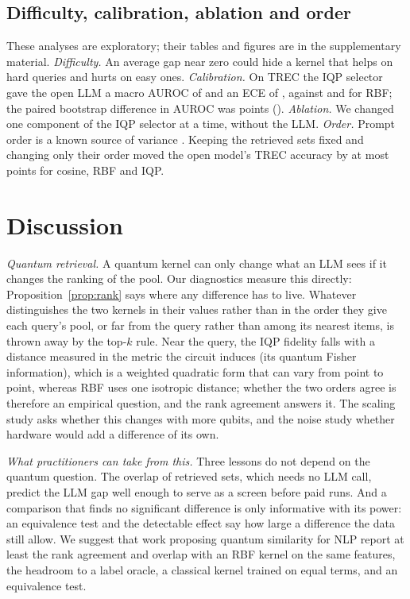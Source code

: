 \subsection{Difficulty, calibration, ablation and order}
These analyses are exploratory; their tables and figures are in the supplementary material.
\emph{Difficulty.} An average gap near zero could hide a kernel that helps on hard queries and hurts on
easy ones. \TDifficulty{} \emph{Calibration.} On TREC the IQP selector gave the open LLM a macro AUROC of
\ROpenTrecAurocIqp{} and an ECE of \ROpenTrecEceIqp, against \ROpenTrecAurocRbf{} and \ROpenTrecEceRbf{} for
RBF; the paired bootstrap difference in AUROC was \ROpenAurocGapTrec{} points (\ROpenAurocGapCITrec).
\TOpenCalib{} \emph{Ablation.} We changed one component of the IQP selector at a time, without the LLM.
\TAblParagraph{} \emph{Order.} Prompt order is a known source of variance \cite{lu2022fantastically}.
Keeping the retrieved sets fixed and changing only their order moved the open model's TREC accuracy by at
most \ROrderSpreadMax{} points for cosine, RBF and IQP. \TOrder{} \TErrors{}

\section{Discussion}

\emph{Quantum retrieval.} A quantum kernel can only change what an LLM sees if it changes the ranking
of the pool. Our diagnostics measure this directly:
\TDiscussDiag{} \TDiscussTheory{} Proposition~\ref{prop:rank} says where any difference has to live.
Whatever distinguishes the two kernels in their values rather than in the order they give each query's
pool, or far from the query rather than among its nearest items, is thrown away by the top-$k$ rule. Near
the query, the IQP fidelity falls with a distance measured in the metric the circuit induces (its quantum
Fisher information), which is a weighted quadratic form that can vary from point to point, whereas RBF
uses one isotropic distance; whether the two orders agree is therefore an empirical question, and the rank
agreement answers it. The scaling study asks whether this changes with more qubits, and the noise study
whether hardware would add a difference of its own. \TDiscussStudies{}

\emph{What practitioners can take from this.} Three lessons do not depend on the quantum question.
\TDiscussRepr{} The overlap of retrieved sets, which needs no LLM call, \TScreenDid{} predict the LLM gap
well enough to serve as a screen before paid runs. And a comparison that finds no significant difference
is only informative with its power: an equivalence test and the detectable effect say how large a
difference the data still allow. We suggest that work proposing quantum similarity for NLP report at
least the rank agreement and overlap with an RBF kernel on the same features, the headroom to a label
oracle, a classical kernel trained on equal terms, and an equivalence test.

